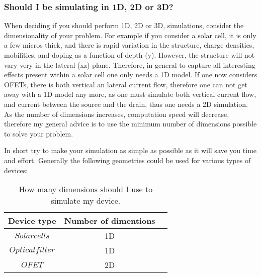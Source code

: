 \subsubsection{Should I be simulating in 1D, 2D or 3D?}
When deciding if you should perform 1D, 2D or 3D, simulations, consider the dimensionality of your problem.  For example if you consider a solar cell, it is only a few micros thick, and there is rapid variation in the structure, charge densities, mobilities, and doping as a function of depth (y).  However, the structure will not vary very in the lateral (xz) plane.  Therefore, in general  to capture all interesting effects present within a solar cell one only needs a 1D model.  If one now considers OFETs, there is both vertical an lateral current flow, therefore one can not get away with a 1D model any more, as one must simulate both vertical current flow, and current between the source and the drain, thus one needs a 2D simulation.  As the number of dimensions increases, computation speed will decrease, therefore my general advice is to use the minimum number of dimensions possible to solve your problem.

In short try to make your simulation as simple as possible as it will save you time and effort.  Generally the following geometries could be used for various types of devices:

\begin{table}[H]
\begin{center}
\begin{tabular}{ |c|c|c| } 
 \hline
	Device type			& 	Number of dimentions  \\ 
 \hline
	$Solar cells$ 		&	1D \\ 
	$Optical filter$	&	1D\\ 
	$OFET$ 				&	2D\\ 
 \hline
\end{tabular}
\caption{How many dimensions should I use to simulate my device.}
\end{center}
\end{table}

